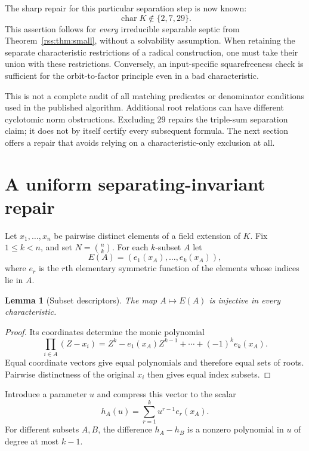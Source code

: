 \documentclass[11pt,a4paper]{article}
\newtheorem{lemma}[theorem]{Lemma}
\theoremstyle{definition}
\theoremstyle{remark}
\newcommand{\charac}{\operatorname{char}}
\begin{document}
The sharp repair for this particular separation step is now known:
\[
 \charac K\notin\{2,7,29\}.
\]
This assertion follows for \emph{every} irreducible separable septic from
Theorem~\ref{rss:thm:small}, without a solvability assumption. When retaining
the separate characteristic restrictions of a radical construction, one
must take their union with these restrictions. Conversely, an
input-specific squarefreeness check is sufficient for the orbit-to-factor
principle even in a bad characteristic.

This is not a complete audit of all matching predicates or denominator
conditions used in the published algorithm. Additional root relations can
have different cyclotomic norm obstructions. Excluding $29$ repairs the
triple-sum separation claim; it does not by itself certify every subsequent
formula. The next section offers a repair that avoids relying on a
characteristic-only exclusion at all.

\section{A uniform separating-invariant repair}
\label{rss:sec:repair}

Let $x_1,\ldots,x_n$ be pairwise distinct elements of a field extension of
$K$. Fix $1\leq k<n$, and set $N=\binom nk$. For each $k$-subset $A$ let
\[
 E(A)=(e_1(x_A),\ldots,e_k(x_A)),
\]
where $e_r$ is the $r$th elementary symmetric function of the elements
whose indices lie in $A$.

\begin{lemma}[Subset descriptors]\label{rss:lem:descriptor}
The map $A\mapsto E(A)$ is injective in every characteristic.
\end{lemma}
\begin{proof}
Its coordinates determine the monic polynomial
\[
 \prod_{i\in A}(Z-x_i)
 =Z^k-e_1(x_A)Z^{k-1}+\cdots+(-1)^k e_k(x_A).
\]
Equal coordinate vectors give equal polynomials and therefore equal sets of
roots. Pairwise distinctness of the original $x_i$ then gives equal index
subsets.
\end{proof}

Introduce a parameter $u$ and compress this vector to the scalar
\begin{equation}
 h_A(u)=\sum_{r=1}^k u^{r-1}e_r(x_A).
 \label{rss:eq:descriptor}
\end{equation}
For different subsets $A,B$, the difference $h_A-h_B$ is a nonzero
polynomial in $u$ of degree at most $k-1$.
\end{document}
